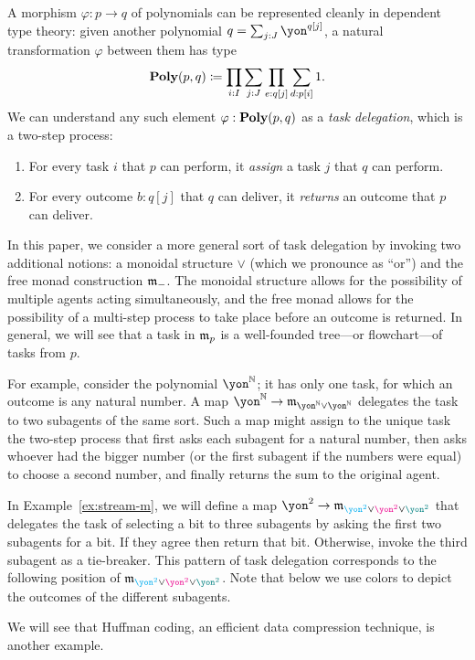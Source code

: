A morphism $\varphi\colon p\to q$ of polynomials can be represented cleanly in dependent type theory: given another polynomial $q=\sum_{j:J}\yon^{q[j]}$, a natural transformation $\varphi$ between them has type
\[
\mathbf{Poly}(p,q)\coloneqq\prod_{i:I}\sum_{j:J}\prod_{e:q[j]}\sum_{d:p[i]}1.
\]
We can understand any such element $\varphi:\mathbf{Poly}(p,q)$ as a \emph{task delegation}, which is a two-step process: 
\begin{enumerate}
\item For every task $i$ that $p$ can perform, it \emph{assign} a task $j$ that $q$ can perform.
\item For every outcome $b:q[j]$ that $q$ can deliver, it \emph{returns} an outcome that $p$ can deliver.
\end{enumerate}

In this paper, we consider a more general sort of task delegation by invoking two additional notions: a monoidal structure $\vee$ (which we pronounce as ``or'') and the free monad construction $\mathfrak{m}_-$. The monoidal structure allows for the possibility of multiple agents acting simultaneously, and the free monad allows for the possibility of a multi-step process to take place before an outcome is returned. In general, we will see that a task in $\mathfrak{m}_p$ is a well-founded tree---or flowchart---of tasks from $p$. 

For example, consider the polynomial $\yon^\nn$; it has only one task, for which an outcome is any natural number. A map $\yon^\nn\to\free_{\yon^\nn\vee\yon^\nn}$ delegates the task to two subagents of the same sort. Such a map might assign to the unique task the two-step process that first asks each subagent for a natural number, then asks whoever had the bigger number (or the first subagent if the numbers were equal) to choose a second number, and finally returns the sum to the original agent. 

In Example~\ref{ex:stream-m}, we will define a map $\yon ^2 \to \free_{{\color{cyan}\yon^2} \vee {\color{magenta}\yon^2} \vee \color{teal}{\yon^2}}$ that delegates the task of selecting a bit to three subagents by asking the first two subagents for a bit. If they agree then return that bit. Otherwise, invoke the third subagent as a tie-breaker. This pattern of task delegation corresponds to the following position of $\free_{{\color{cyan}\yon^2} \vee {\color{magenta}\yon^2} \vee \color{teal}{\yon^2}}$. Note that below we use colors to depict the outcomes of the different subagents. 

We will see that Huffman coding, an efficient data compression technique, is another example.

